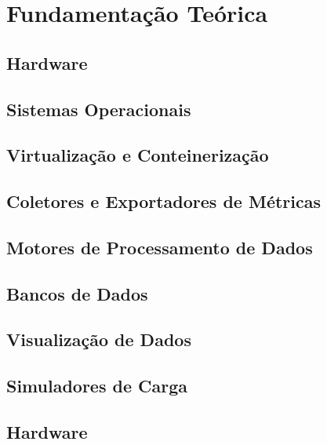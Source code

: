 \chapter{Fundamentação Teórica}
\label{chap2}

\section{Hardware}
\section{Sistemas Operacionais}
\section{Virtualização e Conteinerização}
\section{Coletores e Exportadores de Métricas}
\section{Motores de Processamento de Dados}
\section{Bancos de Dados}
\section{Visualização de Dados}
\section{Simuladores de Carga}
\section{Hardware}